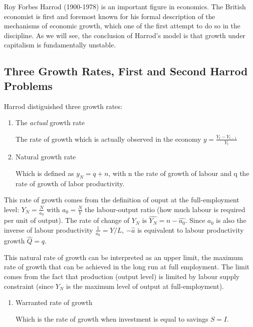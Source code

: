 \documentclass[
  letterpaper,
  DIV=11,
  numbers=noendperiod]{scrreprt}
\begin{document}
Roy Forbes Harrod (1900-1978) is an important figure in economics. The
British economist is first and foremost known for his formal description
of the mechanisms of economic growth, which one of the first attempt to
do so in the discipline. As we will see, the conclusion of Harrod's
model is that growth under capitalism is fundamentally unstable.

\hypertarget{three-growth-rates-first-and-second-harrod-problems}{%
\subsection{Three Growth Rates, First and Second Harrod
Problems}\label{three-growth-rates-first-and-second-harrod-problems}}

Harrod distiguished three growth rates:

\begin{enumerate}
\def\labelenumi{\arabic{enumi}.}
\item
  The \emph{actual} growth rate

  The rate of growth which is actually observed in the economy
  \(y = \frac{Y_{t}-Y_{t-1}}{Y_{t}}\)
\item
  Natural growth rate

  Which is defined as \(y_N = q + n\), with n the rate of growth of
  labour and q the rate of growth of labor productivity.
\end{enumerate}

This rate of growth comes from the definition of ouput at the
full-employment level: \(Y_N = \frac{N}{a_0}\) with
\(a_0 = \frac{N}{Y}\) the labour-output ratio (how much labour is
required per unit of output). The rate of change of \(Y_N\) is
\(\widehat{Y_N} = n - \widehat{a_0}\). Since \(a_0\) is also the inverse
of labour productivity \(\frac{1}{a_0} = Y/L\), \(-\widehat{a}\) is
equivalent to labour productivity growth \(\widehat{Q} = q\).

This natural rate of growth can be interpreted as an upper limit, the
maximum rate of growth that can be achieved in the long run at full
employment. The limit comes from the fact that production (output level)
is limited by labour supply constraint (since \(Y_N\) is the maximum
level of output at full-employment).

\begin{enumerate}
\def\labelenumi{\arabic{enumi}.}
\setcounter{enumi}{2}
\item
  Warranted rate of growth

  Which is the rate of growth when investment is equal to savings
  \(S = I\).
\end{enumerate}
\end{document}
